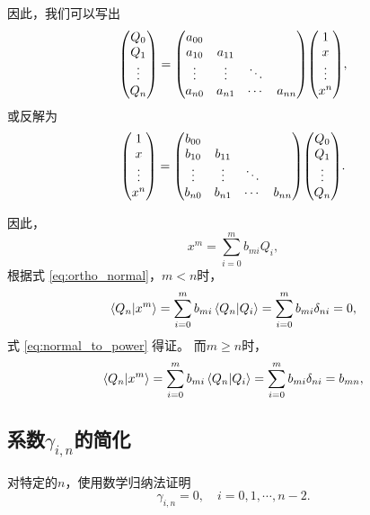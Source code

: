 \documentclass[a4paper,unicode]{report}
\begin{document}
因此，我们可以写出
\begin{equation}
    \mqty(
        Q_0\\   Q_1\\   \vdots\\    Q_n
    )
    = \mqty(
        a_{00}&&&\\
        a_{10}& a_{11}&&\\
        \vdots& \vdots& \ddots&\\
        a_{n0}&  a_{n1}& \cdots& a_{nn}
    ) \mqty(
        1\\   x\\   \vdots\\    x^n
    ),
\end{equation}
或反解为
\begin{equation}
    \mqty(
        1\\   x\\   \vdots\\    x^n
    )
    = \mqty(
        b_{00}&&&\\
        b_{10}& b_{11}&&\\
        \vdots& \vdots& \ddots&\\
        b_{n0}&  b_{n1}& \cdots& b_{nn}
    ) \mqty(
        Q_0\\   Q_1\\   \vdots\\    Q_n
    ).
\end{equation}

因此，
\begin{equation}
    x^m = \sum_{i=0}^m b_{mi} Q_i,
\end{equation}
根据式 \eqref{eq:ortho_normal}，$m < n$时，
\begin{equation}
    \braket{Q_n}{x^m} = \sum_{i=0}^m b_{mi} \braket{Q_n}{Q_i} = \sum_{i=0}^m b_{mi} \delta_{ni} = 0,
\end{equation}
式 \eqref{eq:normal_to_power} 得证。
而$m\ge n$时，
\begin{equation} \label{eq:inner_product_Q_power}
    \braket{Q_n}{x^m} = \sum_{i=0}^m b_{mi} \braket{Q_n}{Q_i} = \sum_{i=0}^m b_{mi} \delta_{ni} = b_{mn},
\end{equation}

\subsection{系数\texorpdfstring{$\gamma_{i,n}$}{γ\_\{i,n\}}的简化}
\label{ssec:gamma_i_n}
对特定的$n$，使用数学归纳法证明
\begin{equation} \label{eq:gamma_eq_0}
    \gamma_{i, n} = 0,\quad i=0,1,\cdots,n-2.
\end{equation}
\end{document}

